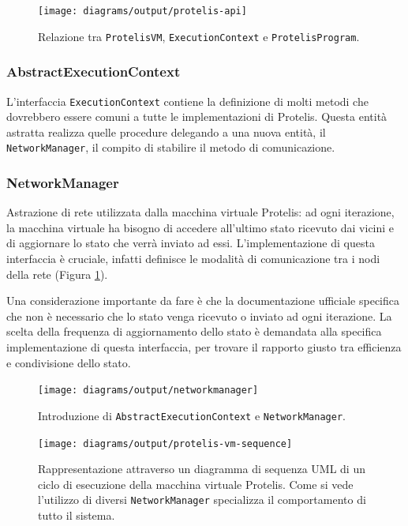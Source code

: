 \begin{figure}
  \centering
  \texttt{[image: diagrams/output/protelis-api]}
  \caption{Relazione tra \texttt{ProtelisVM}, \texttt{ExecutionContext} e
      \texttt{ProtelisProgram}.}
  \label{fig:uml-protelisvm}
\end{figure}

\subsubsection{AbstractExecutionContext}
L'interfaccia \texttt{ExecutionContext} contiene la definizione di molti metodi
che dovrebbero essere comuni a tutte le implementazioni di Protelis. Questa
entità astratta realizza quelle procedure delegando a una nuova entità, il
\texttt{NetworkManager}, il compito di stabilire il metodo di comunicazione.

\subsubsection{NetworkManager}
\label{sec:network-manager}
Astrazione di rete utilizzata dalla macchina virtuale Protelis: ad ogni
iterazione, la macchina virtuale ha bisogno di accedere all'ultimo stato
ricevuto dai vicini e di aggiornare lo stato che verrà inviato ad
essi. L'implementazione di questa interfaccia è cruciale, infatti definisce le
modalità di comunicazione tra i nodi della rete (Figura
\ref{fig:uml-protelisvm}).

Una considerazione importante da fare è che la documentazione ufficiale
specifica che non è necessario che lo stato venga ricevuto o inviato ad ogni
iterazione. La scelta della frequenza di aggiornamento dello stato è demandata
alla specifica implementazione di questa interfaccia, per trovare il rapporto
giusto tra efficienza e condivisione dello stato.

\begin{figure}
  \centering
  \texttt{[image: diagrams/output/networkmanager]}
    \caption{Introduzione di \texttt{AbstractExecutionContext} e \texttt{NetworkManager}.}
  \label{fig:uml-networkmanager}
\end{figure}

\begin{figure}
  \centering
  \texttt{[image: diagrams/output/protelis-vm-sequence]}
  \caption{Rappresentazione attraverso un diagramma di sequenza UML di un ciclo
    di esecuzione della macchina virtuale Protelis. Come si vede l'utilizzo di
    diversi \texttt{NetworkManager} specializza il comportamento di tutto il
    sistema.}
    \label{fig:uml-protelisvm-sequence}
\end{figure}


